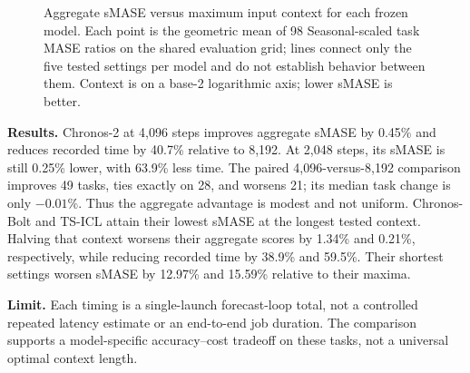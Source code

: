 \documentclass[11pt,a4paper]{article}
\begin{document}
\begin{figure}[H]
\centering
{}
\caption{Aggregate sMASE versus maximum input context for each frozen model.
Each point is the geometric mean of 98 Seasonal-scaled task MASE ratios on
the shared evaluation grid; lines connect only the five tested settings per
model and do not establish behavior between them. Context is on a base-2
logarithmic axis; lower sMASE is better.}
\end{figure}

\textbf{Results.} Chronos-2 at 4,096 steps improves aggregate sMASE by
0.45\% and reduces recorded time by 40.7\% relative to 8,192. At 2,048
steps, its sMASE is still 0.25\% lower, with 63.9\% less time. The paired
4,096-versus-8,192 comparison improves 49 tasks, ties exactly on 28, and
worsens 21; its median task change is only $-0.01\%$. Thus the aggregate
advantage is modest and not uniform. Chronos-Bolt and TS-ICL attain their
lowest sMASE at the longest tested context. Halving that context worsens
their aggregate scores by 1.34\% and 0.21\%, respectively, while reducing
recorded time by 38.9\% and 59.5\%. Their shortest settings worsen sMASE
by 12.97\% and 15.59\% relative to their maxima.

\textbf{Limit.} Each timing is a single-launch forecast-loop total, not a
controlled repeated latency estimate or an end-to-end job duration. The
comparison supports a model-specific accuracy--cost tradeoff on these tasks,
not a universal optimal context length.
\end{document}

